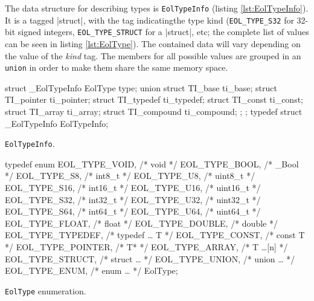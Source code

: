 The data structure for describing types is \verb|EolTypeInfo| (listing
\vref{lst:EolTypeInfo}). It is a tagged \Mc|struct|, with the tag
indicatingthe type kind (\verb|EOL_TYPE_S32| for 32-bit signed integers,
\verb|EOL_TYPE_STRUCT| for a \Mc|struct|, etc; the complete list of values
can be seen in listing \vref{lst:EolType}). The contained data will vary
depending on the value of the \emph{kind} tag. The members for all possible
values are grouped in an \texttt{union} in order to make them share the
same memory space.

\begin{listing}[H]
  \begin{ccode}
    struct _EolTypeInfo {
      EolType type;
      union {
        struct TI_base     ti_base;
        struct TI_pointer  ti_pointer;
        struct TI_typedef  ti_typedef;
        struct TI_const    ti_const;
        struct TI_array    ti_array;
        struct TI_compound ti_compound;
      };
    };
    typedef struct _EolTypeInfo EolTypeInfo;
  \end{ccode}
  \caption{\texttt{EolTypeInfo}.}
  \label{lst:EolTypeInfo}
\end{listing}

\begin{listing}[f]
  \centering
  \begin{ccode}
    typedef enum {
      EOL_TYPE_VOID,    /* void        */
      EOL_TYPE_BOOL,    /* _Bool       */
      EOL_TYPE_S8,      /* int8_t      */
      EOL_TYPE_U8,      /* uint8_t     */
      EOL_TYPE_S16,     /* int16_t     */
      EOL_TYPE_U16,     /* uint16_t    */
      EOL_TYPE_S32,     /* int32_t     */
      EOL_TYPE_U32,     /* uint32_t    */
      EOL_TYPE_S64,     /* int64_t     */
      EOL_TYPE_U64,     /* uint64_t    */
      EOL_TYPE_FLOAT,   /* float       */
      EOL_TYPE_DOUBLE,  /* double      */
      EOL_TYPE_TYPEDEF, /* typedef … T */
      EOL_TYPE_CONST,   /* const T     */
      EOL_TYPE_POINTER, /* T*          */
      EOL_TYPE_ARRAY,   /* T …[n]      */
      EOL_TYPE_STRUCT,  /* struct …    */
      EOL_TYPE_UNION,   /* union …     */
      EOL_TYPE_ENUM,    /* enum …      */
    } EolType;
  \end{ccode}
  \caption{\texttt{EolType} enumeration.}
  \label{lst:EolType}
\end{listing}


